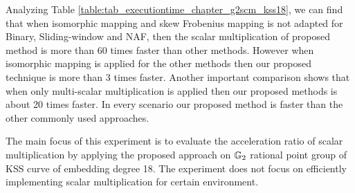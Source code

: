 \renewcommand{\baselinestretch}{1.5}
\begin{table}[!ht]
\centering
\caption{Comparison of execution time in [ms] for scalar multiplication in KSS-18 curve.}
\label{table:tab_executiontime_chapter_g2scm_kss18}
\end{table}
\renewcommand{\baselinestretch}{1.0}

Analyzing  Table \ref{table:tab_executiontime_chapter_g2scm_kss18}, we can find that when isomorphic mapping  and skew Frobenius mapping is not adapted for  Binary, Sliding-window and NAF, then the scalar multiplication of  proposed method is more than 60 times faster than other methods. However when isomorphic mapping  is applied for the other methods then our proposed technique is more than 3 times faster. Another important comparison shows that when only multi-scalar multiplication is applied then our proposed methods is about 20 times faster. 
In every scenario our proposed method is faster than the other commonly used approaches.


The main focus of this experiment is to evaluate the  acceleration ratio of scalar multiplication by applying the proposed approach on ${\mathbb{G}}_{2}$ rational point group of  KSS curve of embedding degree 18. The experiment does not focus on efficiently implementing scalar multiplication for certain environment. 

